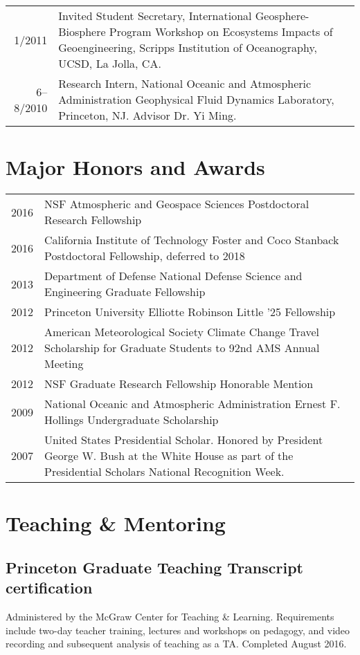 \documentclass[12pt,letterpaper]{article}
\begin{document}
\begin{center}
\begin{tabularx}{\textwidth}{rX}
1/2011 & Invited Student Secretary, International Geosphere-Biosphere Program Workshop on Ecosystems Impacts of Geoengineering, Scripps Institution of Oceanography, UCSD, La Jolla, CA.\\
6–8/2010 & Research Intern, National Oceanic and Atmospheric Administration Geophysical Fluid Dynamics Laboratory, Princeton, NJ. Advisor Dr. Yi Ming.\\
\end{tabularx}
\end{center}
\section*{Major Honors and Awards}
\label{sec:org6d094fe}
\begin{center}
\begin{tabularx}{\textwidth}{lX}
2016 & NSF Atmospheric and Geospace Sciences Postdoctoral Research Fellowship\\
2016 & California Institute of Technology Foster and Coco Stanback Postdoctoral Fellowship, deferred to 2018\\
2013 & Department of Defense National Defense Science and Engineering Graduate Fellowship\\
2012 & Princeton University Elliotte Robinson Little '25 Fellowship\\
2012 & American Meteorological Society Climate Change Travel Scholarship for Graduate Students to 92nd AMS Annual Meeting\\
2012 & NSF Graduate Research Fellowship Honorable Mention\\
2009 & National Oceanic and Atmospheric Administration Ernest F. Hollings Undergraduate Scholarship\\
2007 & United States Presidential Scholar.  Honored by President George W. Bush at the White House as part of the Presidential Scholars National Recognition Week.\\
\end{tabularx}
\end{center}
\section*{Teaching \& Mentoring}
\label{sec:org105e565}
\subsection*{Princeton Graduate Teaching Transcript certification}
\label{sec:org28fc1ff}
Administered by the McGraw Center for Teaching \& Learning.  Requirements include
two-day teacher training, lectures and workshops on pedagogy, and video recording
and subsequent analysis of teaching as a TA.  Completed August 2016.
\end{document}
